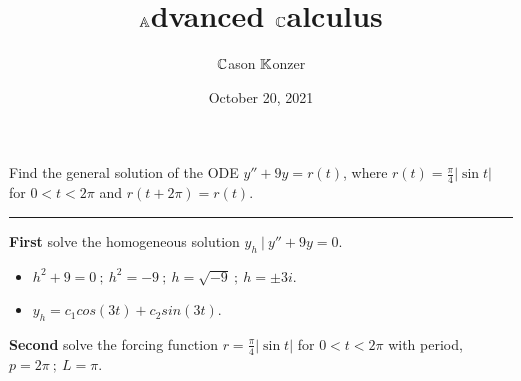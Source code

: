 \documentclass[10pt]{article}
\title{$\mathbb{A}$dvanced $\mathbb{C}$alculus}
\author{$\mathbb{C}$ason $\mathbb{K}$onzer}
\date{October 20, 2021}
\begin{document}
\maketitle

\newpage

\section{\underline{}}
\label{sec: Problem 1}
\noindent
Find the general solution of the ODE $ y'' + 9y = r(t) $, where $ \displaystyle r(t) = \frac{\pi}{4} |\sin{t}| $ for $ 0 < t < 2\pi $ and $ r(t + 2\pi) = r(t) $. \\
\vspace{2.5mm}
\hrule 

\vspace{7.5mm}

\noindent
\textbf{First} solve the homogeneous solution $ y_h \ | \ y'' + 9y = 0 $. \\

\begin{itemize}
    \item $ \displaystyle h^2 + 9 = 0 \ ; \ h^2 = -9 \ ; \ h = \sqrt{-9} \ ; \ h = \pm 3i $. \\
    \item $ \displaystyle y_h = c_1 cos(3t) + c_2 sin(3t) $. \\
\end{itemize}

\noindent
\textbf{Second} solve the forcing function $ \displaystyle r = \frac{\pi}{4} |\sin{t}| $ for $ 0 < t < 2\pi $ with period, $ p = 2\pi \ ; \ L = \pi $. \\
\end{document}
